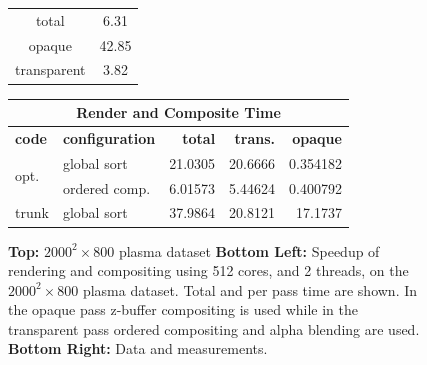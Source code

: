 \documentclass[a4paper,10pt]{report}
\begin{document}
\begin{figure}[ht]
\begin{minipage}{0.5\textwidth}
{\begin{tabular}{|c|c|}
 total & 6.31 \\ \cline{1-2}
 opaque & 42.85 \\ \cline{1-2}
 transparent & 3.82 \\ \hline
\end{tabular}}\vspace{0.08in}
{\footnotesize
\def\arraystretch{1.5}
\begin{tabular}{|l|l|r|r|r|}
\hline
\multicolumn{5}{|c|}{\bf Render and Composite Time} \\ \hline
{\bf code} & {\bf configuration} & {\bf total} & {\bf trans.} & {\bf opaque} \\ \hline
\multirow{2}{*}{opt.} & global sort & 21.0305 & 20.6666 & 0.354182 \\ \cline{2-5}
 & ordered comp. &  6.01573 & 5.44624 & 0.400792 \\ \hline
trunk & global sort & 37.9864 & 20.8121 & 17.1737 \\ \hline
\end{tabular}}
\end{minipage}
\caption{\footnotesize {\bf Top:} $2000^2 \times 800$ plasma dataset {\bf Bottom Left:} Speedup of rendering and compositing using 512 cores, and 2 threads, on the $2000^2 \times 800$ plasma dataset. Total and per pass time are shown. In the opaque pass z-buffer compositing is used while in the transparent pass ordered compositing and alpha blending are used. {\bf Bottom Right:} Data and measurements.}
\label{fig:speedup_vpic}
\end{figure}
\end{document}

